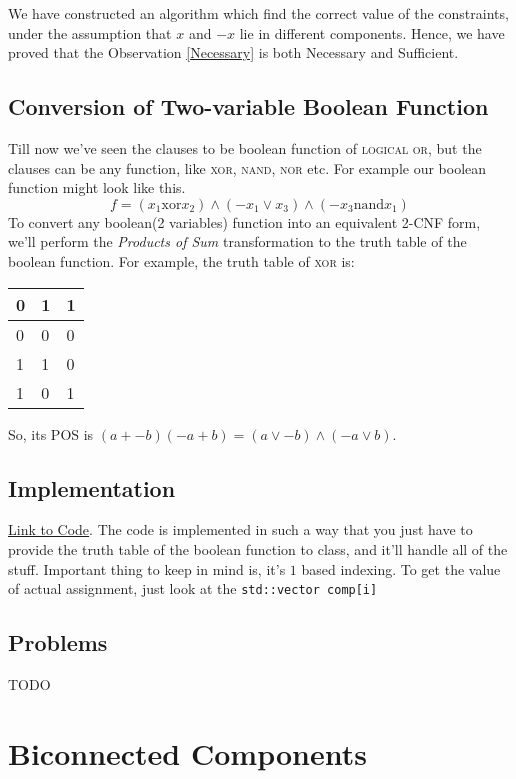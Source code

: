 \documentclass{article}
\theoremstyle{definition}
\begin{document}
We have constructed an algorithm which find the correct value of the constraints,
under the assumption that $x$ and $-x$ lie in different components. Hence, we have proved that the Observation \ref{Necessary}
is both Necessary and Sufficient.

\subsection{Conversion of Two-variable Boolean Function}
Till now we've seen the clauses to be boolean function of \textsc{logical or}, but the
clauses can be any function, like \textsc{xor, nand, nor} etc. For example our boolean function
might look like this.
\[
    f = (x_1 \text{xor} x_2) \land (-x_1 \lor x_3) \land (-x_3 \text{nand} x_1)
\]
To convert any boolean(2 variables) function into an equivalent 2-CNF form, we'll perform the
\textit{Products of Sum} transformation to the truth table of the boolean function. For example, the
truth table of \textsc{xor} is:

\begin{center}
\begin{table}[htb]
\begin{tabular}{|l|l|l|}
\hline
0 & 1 & 1 \\ \hline
0 & 0 & 0 \\ \hline
1 & 1 & 0 \\ \hline
1 & 0 & 1 \\ \hline
\end{tabular}
\end{table}
\end{center}

So, its POS is $(a + -b)(-a + b) = (a \lor -b) \land (-a \lor b)$.

\subsection{Implementation}
\href{https://github.com/Equlnox/IITP-ACM-Notebook/blob/master/code/graphs/2sat.cpp}{Link to Code}. The code
is implemented in such a way that you just have to provide the truth table of the boolean function to class, and it'll handle all of the stuff.
Important thing to keep in mind is, it's $1$ based indexing. To get the value of actual assignment,
just look at the \texttt{std::vector comp[i]}

\subsection{Problems}
TODO

\section{Biconnected Components}
\end{document}
